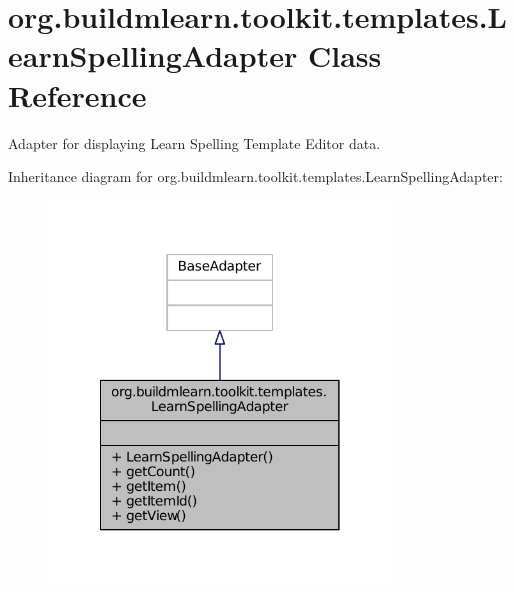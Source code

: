 \hypertarget{classorg_1_1buildmlearn_1_1toolkit_1_1templates_1_1LearnSpellingAdapter}{\section{org.\-buildmlearn.\-toolkit.\-templates.\-Learn\-Spelling\-Adapter Class Reference}
\label{classorg_1_1buildmlearn_1_1toolkit_1_1templates_1_1LearnSpellingAdapter}
}


Adapter for displaying Learn Spelling Template Editor data.  




Inheritance diagram for org.\-buildmlearn.\-toolkit.\-templates.\-Learn\-Spelling\-Adapter\-:
\nopagebreak
\begin{figure}[H]
\begin{center}
\leavevmode
\includegraphics[width=258pt]{d7/ddc/classorg_1_1buildmlearn_1_1toolkit_1_1templates_1_1LearnSpellingAdapter__inherit__graph}
\end{center}
\end{figure}


